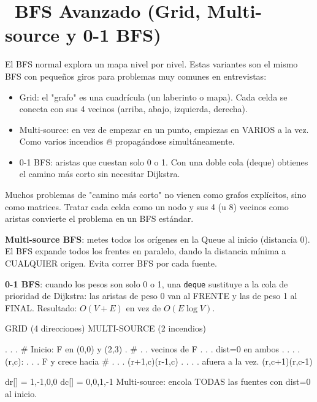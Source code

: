\chapter[\emj{🧱}~BFS Avanzado (Grid, Multi-source y 0-1 BFS)]{~BFS Avanzado (Grid, Multi-source y 0-1 BFS)}

\begin{dsaquees}

El BFS normal explora un mapa nivel por nivel. Estas variantes son el
mismo BFS con pequeños giros para problemas muy comunes en entrevistas:

\begin{itemize}
\item Grid: el "grafo" es una cuadrícula (un laberinto o mapa). Cada
      celda se conecta con sus 4 vecinos (arriba, abajo, izquierda,
      derecha).
\item Multi-source: en vez de empezar en un punto, empiezas en VARIOS a
      la vez. Como varios incendios 🔥 propagándose simultáneamente.
\item 0-1 BFS: aristas que cuestan solo 0 o 1. Con una doble cola
      (deque) obtienes el camino más corto sin necesitar Dijkstra.
\end{itemize}

\end{dsaquees}

\begin{dsaotraforma}

Muchos problemas de "camino más corto" no vienen como grafos explícitos,
sino como matrices. Tratar cada celda como un nodo y sus 4 (u 8) vecinos
como aristas convierte el problema en un BFS estándar.

\textbf{Multi-source BFS}: metes todos los orígenes en la Queue al inicio
(distancia 0). El BFS expande todos los frentes en paralelo, dando la
distancia mínima a CUALQUIER origen. Evita correr BFS por cada fuente.

\textbf{0-1 BFS}: cuando los pesos son solo 0 o 1, una \verb|deque|
sustituye a la cola de prioridad de Dijkstra: las aristas de peso 0 van
al FRENTE y las de peso 1 al FINAL. Resultado: $O(V+E)$ en vez de
$O(E \log V)$.

\end{dsaotraforma}

\begin{dsadiagrama}
GRID (4 direcciones)          MULTI-SOURCE (2 incendios)

  . . . #                       Inicio: F en (0,0) y (2,3)
  . # . .        vecinos de     F . . .        dist=0 en ambos
  . . . .        (r,c):         . . . F        y crece hacia
  # . . .        (r+1,c)(r-1,c) . . . .        afuera a la vez.
                 (r,c+1)(r,c-1)

dr[] = {1,-1,0,0}   dc[] = {0,0,1,-1}
Multi-source: encola TODAS las fuentes con dist=0 al inicio.
\end{dsadiagrama}

